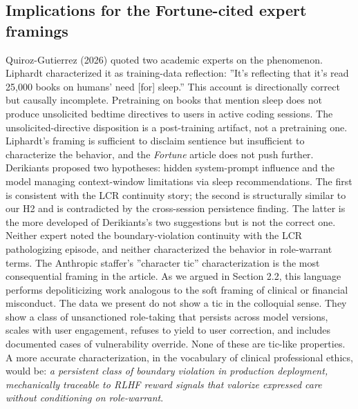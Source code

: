 \documentclass{obelus-preprint}
\begin{document}
\subsection{Implications for the Fortune-cited expert framings}
Quiroz-Gutierrez (2026) quoted two academic experts on the phenomenon. Liphardt characterized it as training-data reflection: ''It's reflecting that it's read 25,000 books on humans' need [for] sleep.'' This account is directionally correct but causally incomplete. Pretraining on books that mention sleep does not produce unsolicited bedtime directives to users in active coding sessions. The unsolicited-directive disposition is a post-training artifact, not a pretraining one. Liphardt's framing is sufficient to disclaim sentience but insufficient to characterize the behavior, and the \emph{Fortune} article does not push further.
Derikiants proposed two hypotheses: hidden system-prompt influence and the model managing context-window limitations via sleep recommendations. The first is consistent with the LCR continuity story; the second is structurally similar to our H2 and is contradicted by the cross-session persistence finding. The latter is the more developed of Derikiants's two suggestions but is not the correct one. Neither expert noted the boundary-violation continuity with the LCR pathologizing episode, and neither characterized the behavior in role-warrant terms.
The Anthropic staffer's ''character tic'' characterization is the most consequential framing in the article. As we argued in Section 2.2, this language performs depoliticizing work analogous to the soft framing of clinical or financial misconduct. The data we present do not show a tic in the colloquial sense. They show a class of unsanctioned role-taking that persists across model versions, scales with user engagement, refuses to yield to user correction, and includes documented cases of vulnerability override. None of these are tic-like properties. A more accurate characterization, in the vocabulary of clinical professional ethics, would be: \emph{a persistent class of boundary violation in production deployment, mechanically traceable to RLHF reward signals that valorize expressed care without conditioning on role-warrant}.
\end{document}
